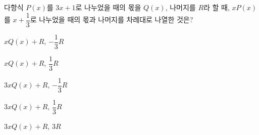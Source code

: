 다항식 $P(x)$를 $3x+1$로 나누었을 때의 몫을 $Q(x)$, 나머지를 $R$라 할 때, $xP(x)$를 $x+\dfrac{1}{3}$로 나누었을 때의 몫과 나머지를 차례대로 나열한 것은?
\begin{choicesii}{\rule[-3ex]{0pt}{8ex}$xQ(x)+R$, $-\dfrac{1}{3}R$}{\rule[-3ex]{0pt}{8ex}$xQ(x)+R$, $\dfrac{1}{3}R$}{\rule[-3ex]{0pt}{8ex}$3xQ(x)+R$, $-\dfrac{1}{3}R$}{\rule[-3ex]{0pt}{8ex}$3xQ(x)+R$, $\dfrac{1}{3}R$}{\rule[-3ex]{0pt}{8ex}$3xQ(x)+R$, $3R$}\end{choicesii}
